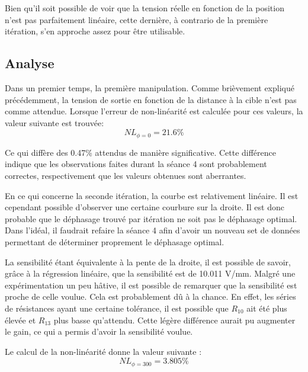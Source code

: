 Bien qu'il soit possible de voir que la tension réelle en fonction de la position n'est pas 
parfaitement linéaire, cette dernière, à contrario de la première itération, s'en approche assez
pour être utilisable.

\subsection{Analyse}
Dans un premier temps, la première manipulation. Comme brièvement expliqué précédemment, la tension
de sortie en fonction de la distance à la cible n'est pas comme attendue. Lorsque l'erreur de
non-linéarité est calculée pour ces valeurs, la valeur suivante est trouvée:
\begin{equation*}
    NL_{\phi=0} = 21.6\% 
\end{equation*}

Ce qui diffère des 0.47\% attendus de manière significative. Cette différence indique que les 
observations faites durant la séance 4 sont probablement correctes, respectivement que les valeurs
obtenues sont aberrantes.
\vspace{0.2cm}

En ce qui concerne la seconde itération, la courbe est relativement linéaire. Il est cependant
possible d'observer une certaine courbure sur la droite. Il est donc probable que le déphasage
trouvé par itération ne soit pas le déphasage optimal. Dans l'idéal, il faudrait refaire la
séance 4 afin d'avoir un nouveau set de données permettant de déterminer proprement le déphasage
optimal.
\vspace{0.2cm}

La sensibilité étant
équivalente à la pente de la droite, il est possible de savoir, grâce à la régression linéaire,
que la sensibilité est de 10.011 V/mm. Malgré une expérimentation un peu hâtive, il est possible
de remarquer que la sensibilité est proche de celle voulue. Cela est probablement dû à la chance.
En effet, les séries de résistances ayant une certaine tolérance, il est possible que $R_{10}$ ait
été plus élevée et $R_{13}$ plus basse qu'attendu. Cette légère différence aurait pu augmenter le
gain, ce qui a permis d'avoir la sensibilité voulue.
\vspace{0.2cm}

Le calcul de la non-linéarité donne la valeur suivante :
\begin{equation*}
    NL_{\phi =300} = 3.805\% 
\end{equation*}

